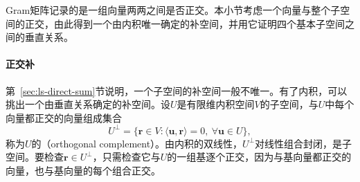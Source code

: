 Gram矩阵记录的是一组向量两两之间是否正交。本小节考虑一个向量与整个子空间的正交，由此得到一个由内积唯一确定的补空间，并用它证明四个基本子空间之间的垂直关系。

\paragraph{正交补}
第~\ref{sec:ls-direct-sum}节说明，一个子空间的补空间一般不唯一。有了内积，可以挑出一个由垂直关系确定的补空间。设$U$是有限维内积空间$V$的子空间，与$U$中每个向量都正交的向量组成集合
\[
 U^\perp=\{\bm r\in V:\langle\bm u,\bm r\rangle=0,\ \forall\bm u\in U\},
\]
称为$U$的（orthogonal complement）。由内积的双线性，$U^\perp$对线性组合封闭，是子空间。要检查$\bm r\in U^\perp$，只需检查它与$U$的一组基逐个正交，因为与基向量都正交的向量，也与基向量的每个组合正交。

